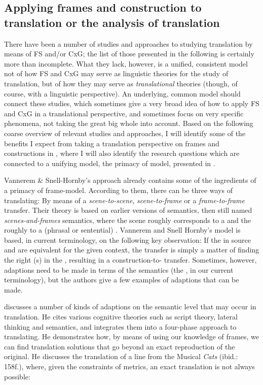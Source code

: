 \documentclass[output=paper]{LSP/langsci}
\begin{document}
\subsection{Applying frames and construction to translation or the analysis of translation}\label{czulo:sec:2.2}

There have been a number of studies and approaches to studying translation by means of FS and/or CxG; the list of those presented in the following is certainly more than incomplete. What they lack, however, is a unified, consistent model not of how FS and CxG may serve as linguistic theories for the study of translation, but of how they may serve as \textit{translational} theories (though, of course, with a linguistic perspective). An underlying, common model should connect these studies, which sometimes give a very broad idea of how to apply FS and CxG in a translational perspective, and sometimes focus on very specific phenomena, not taking the great big whole into account. Based on the following coarse overview of relevant studies and approaches, I will identify some of the benefits I expect from taking a translation perspective on frames and constructions in , where I will also identify the research questions which are connected to a unifying model, the primacy of  model, presented in .

Vannerem \& Snell-Hornby's \citeyearpar{Vannerem1986} approach already contains some of the ingredients of a primacy of frame-model. According to them, there can be three ways of translating: By means of a \textit{scene-to-scene}, \textit{scene-to-frame} or a \textit{frame-to-frame} transfer. Their theory is based on earlier versions of  semantics, then still named \textit{scenes-and-frames} semantics, where the scene roughly corresponds to a  and the  roughly to a (phrasal or sentential) . Vannerem and Snell Hornby's model is based, in current terminology, on the following key observation: If the  in source and  are equivalent for the given context, the transfer is simply a matter of finding the right (s) in the , resulting in a construction-to- transfer. Sometimes, however, adaptions need to be made in terms of the semantics (the , in our current terminology), but the authors give a few examples of adaptions that can be made.

\citet{Kussmaul2000} discusses a number of kinds of adaptions on the semantic level that may occur in translation. He cites various cognitive theories such as script theory, lateral thinking and  semantics, and integrates them into a four-phase approach to translating. He demonstrates how, by means of using our knowledge of frames, we can find translation solutions that go beyond an exact reproduction of the original. He discusses the translation of a line from the Musical \textit{Cats} (ibid.: 158f.), where, given the constraints of metrics, an exact translation is not always possible:
\end{document}
